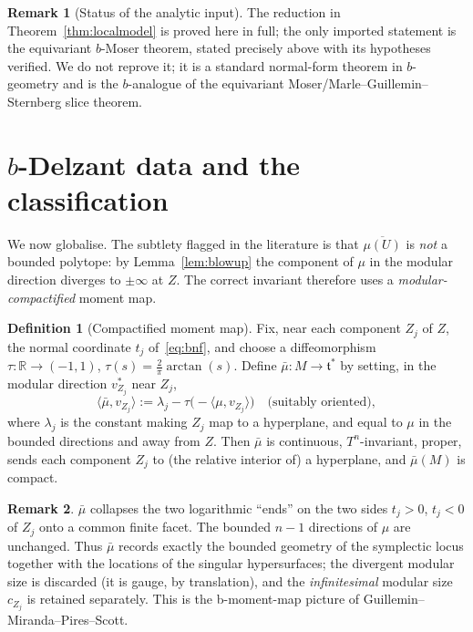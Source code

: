 \documentclass{amsart}
\theoremstyle{definition}
\newtheorem{definition}{Definition}
\newtheorem{remark}{Remark}
\begin{document}
\begin{remark}[Status of the analytic input]
The reduction in Theorem~\ref{thm:localmodel} is proved here in full; the only
imported statement is the equivariant $b$-Moser theorem, stated precisely above
with its hypotheses verified. We do not reprove it; it is a standard
normal-form theorem in $b$-geometry and is the $b$-analogue of the equivariant
Moser/Marle--Guillemin--Sternberg slice theorem.
\end{remark}

\section{$b$-Delzant data and the classification}

We now globalise. The subtlety flagged in the literature is that
$\overline{\mu(U)}$ is \emph{not} a bounded polytope: by
Lemma~\ref{lem:blowup} the component of $\mu$ in the modular direction diverges
to $\pm\infty$ at $Z$. The correct invariant therefore uses a
\emph{modular-compactified} moment map.

\begin{definition}[Compactified moment map]\label{def:barmu}
Fix, near each component $Z_j$ of $Z$, the normal coordinate $t_j$
of~\eqref{eq:bnf}, and choose a diffeomorphism $\tau\colon\mathbb R\to(-1,1)$,
$\tau(s)=\tfrac{2}{\pi}\arctan(s)$. Define
$\bar\mu\colon M\to\mathfrak t^*$ by setting, in the modular direction
$v^*_{Z_j}$ near $Z_j$,
\[
\langle\bar\mu,v_{Z_j}\rangle:=\lambda_j-\tau\!\bigl(-\langle\mu,v_{Z_j}
\rangle\bigr)\quad\text{(suitably oriented)},
\]
where $\lambda_j$ is the constant making $Z_j$ map to a hyperplane, and equal to
$\mu$ in the bounded directions and away from $Z$. Then $\bar\mu$ is continuous,
$T^n$-invariant, proper, sends each component $Z_j$ to (the relative interior of)
a hyperplane, and $\bar\mu(M)$ is compact.
\end{definition}

\begin{remark}
$\bar\mu$ collapses the two logarithmic ``ends'' on the two sides $t_j>0$,
$t_j<0$ of $Z_j$ onto a common finite facet. The bounded $n-1$ directions of
$\mu$ are unchanged. Thus $\bar\mu$ records exactly the bounded geometry of the
symplectic locus together with the locations of the singular hypersurfaces;
the divergent modular size is discarded (it is gauge, by translation), and the
\emph{infinitesimal} modular size $c_{Z_j}$ is retained separately. This is the
b-moment-map picture of Guillemin--Miranda--Pires--Scott.
\end{remark}
\end{document}
